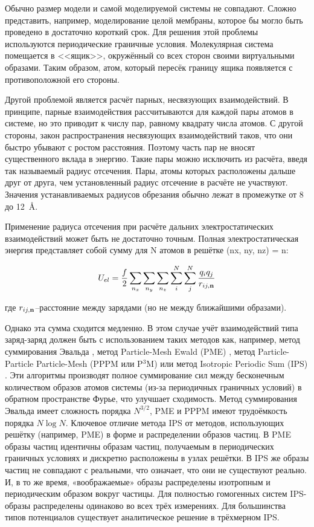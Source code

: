 Обычно размер модели и самой моделируемой системы не совпадают. Сложно представить, например, моделирование целой мембраны, которое бы могло быть проведено в достаточно короткий срок. Для решения этой проблемы используются периодические граничные условия. Молекулярная система помещается в <<ящик>>, окружённый со всех сторон своими виртуальными образами. Таким образом, атом, который пересёк границу ящика появляется с противоположной его стороны.

Другой проблемой является расчёт парных, несвязующих взаимодействий. В принципе, парные взаимодействия рассчитываются для каждой пары атомов в системе, но это приводит к числу пар, равному квадрату числа атомов. С другой стороны, закон распространения несвязующих взаимодействий таков, что они быстро убывают с ростом расстояния. Поэтому часть пар не вносят существенного вклада в энергию. Такие пары можно исключить из расчёта, введя так называемый радиус отсечения. Пары, атомы которых расположены дальше друг от друга, чем установленный радиус отсечение в расчёте не участвуют. Значения устанавливаемых радиусов обрезания обычно лежат в промежутке от 8 до 12~\AA.

Применение радиуса отсечения при расчёте дальних электростатических взаимодействий может быть не достаточно точным. Полная электростатическая энергия представляет собой сумму для N атомов в решётке (nx, ny, nz) = n:

\[
U_{el} = \frac{f}{2} \sum_{n_x}\sum_{n_y} \sum_{n_z} \sum_{i}^{N}\sum_{j}^{N} {\frac{q_i q_j}{r_{ij,\bold n }}}
\]

где $r_{ij,\bold n}$--расстояние между зарядами (но не между ближайшими образами). 

Однако эта сумма сходится медленно. В этом случае учёт взаимодействий типа заряд-заряд должен быть с использованием таких методов как, например, метод суммирования Эвальда \cite{Ewald1921}, метод Particle-Mesh Ewald (PME) \cite{Darden1993,Essmann1995}, метод Particle-Particle Particle-Mesh (PPPM или P${}^3$M) \cite{Hockney1981,Luty1995} или метод Isotropic Periodic Sum (IPS) \cite{Wu2005}. Эти алгоритмы производят полное суммирование сил между бесконечным количеством образов атомов системы (из-за периодичных граничных условий) в обратном пространстве Фурье, что улучшает сходимость. Метод суммирования Эвальда имеет сложность порядка $N^{3/2}$, PME и PPPM имеют трудоёмкость порядка $N\log N$. Ключевое отличие метода IPS от методов, использующих решётку (например, PME) в форме и распределении образов частиц. В PME образы частиц идентичны образам частиц, получаемым в периодических граничных условиях и дискретно расположены в узлах решётки. В IPS же образы частиц не совпадают с реальными, что означает, что они не существуют реально. И, в то же время, «воображаемые» образы распределены изотропным и периодическим образом вокруг частицы. Для полностью гомогенных систем IPS-образы распределены одинаково во всех трёх измерениях. Для большинства типов потенциалов существует аналитическое решение в трёхмерном IPS.

